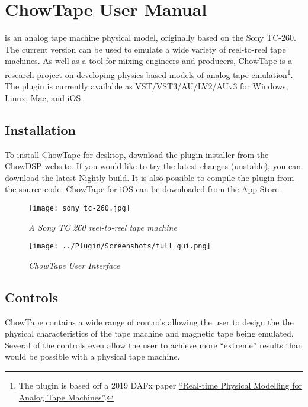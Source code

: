 \documentclass[landscape,twocolumn,a5paper]{manual}
\begin{document}
\section{ChowTape User Manual}

\noindent
{} is an analog tape machine physical model,
originally based on the Sony TC-260. The current version
can be used to emulate a wide variety of reel-to-reel tape
machines. As well as a tool for mixing engineers and producers,
ChowTape is a research project on developing physics-based
models of analog tape emulation\footnote{The plugin is based off a 2019 DAFx paper
\href{http://dafx2019.bcu.ac.uk/papers/DAFx2019_paper_3.pdf}{``Real-time Physical Modelling for Analog Tape Machines''}.}.
The plugin is currently available as VST/VST3/AU/LV2/AUv3 for
Windows, Linux, Mac, and iOS.

\subsection{Installation}
To install ChowTape for desktop, download the plugin installer
from the \href{https://chowdsp.com/products.html#tape}{ChowDSP website}.
If you would like to try the latest changes (unstable), you can
download the latest \href{https://chowdsp.com/nightly.html}{Nightly build}.
It is also possible to compile the plugin
\href{https://github.com/jatinchowdhury18/AnalogTapeModel/blob/master/BUILDING.md}{from the source code}.
ChowTape for iOS can be downloaded from the
\href{https://apps.apple.com/us/app/chowtapemodel/id1557806564}{App Store}.

\begin{figure}[ht]
    \center
    \texttt{[image: sony\_tc-260.jpg]}
    \caption{\label{TapeMachine}{\it A Sony TC 260 reel-to-reel tape machine}}
\end{figure}

\begin{figure}[ht]
    \center
    \texttt{[image: ../Plugin/Screenshots/full\_gui.png]}
    \caption{\label{full_gui}{\it ChowTape User Interface}}
\end{figure}

\subsection{Controls}
ChowTape contains a wide range of controls allowing the
user to design the the physical characteristics of the tape
machine and magnetic tape being emulated. Several of the
controls even allow the user to achieve more ``extreme''
results than would be possible with a physical tape machine.
\end{document}
